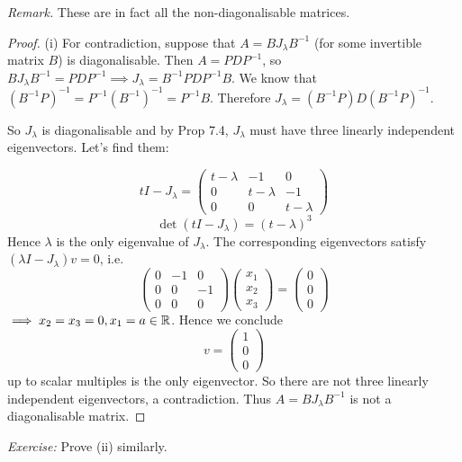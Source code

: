 \documentclass[10pt]{scrartcl}
\begin{document}
\emph{Remark.} These are in fact all the non-diagonalisable matrices.

\begin{proof}(i) For contradiction, suppose that $A = BJ_\lambda B^{-1}$ (for some invertible matrix $B$) is diagonalisable. Then $A = PDP^{-1}$, so $BJ_\lambda B^{-1} = PDP^{-1} \implies J_{\lambda} = B^{-1}PDP^{-1}B$. We know that $(B^{-1}P)^{-1} = P^{-1}(B^{-1})^{-1} = P^{-1}B$. Therefore $J_{\lambda} = (B^{-1}P)D(B^{-1}P)^{-1}$. 

So $J_\lambda$ is diagonalisable and by Prop 7.4, $J_\lambda$ must have three linearly independent eigenvectors. Let's find them:

\[
  tI - J_\lambda = \begin{pmatrix}
 t - \lambda & -1 & 0 \\ 0 & t-\lambda & -1 \\ 0 & 0& t-\lambda 	
 \end{pmatrix}
\]
\[
  \det(tI-J_\lambda) = (t-\lambda)^3
\]
Hence $\lambda$ is the only eigenvalue of $J_\lambda$. The corresponding eigenvectors satisfy $(\lambda I - J_\lambda)v = 0$, i.e. 
\[
  \begin{pmatrix}
  0 & -1 & 0\\ 0 & 0 & -1 \\ 0 & 0 & 0	
  \end{pmatrix}\begin{pmatrix}
x_1 \\ x_2 \\ x_3	
\end{pmatrix} = \begin{pmatrix}
 0 \\ 0\\ 0	
 \end{pmatrix}
\]
$\implies x_2 = x_3 = 0, x_1 = a \in\mathbb{R}$. Hence we conclude \[v = \begin{pmatrix}
 1 \\ 0 \\ 0	
 \end{pmatrix}\] up to scalar multiples is the only eigenvector. So there are not three linearly independent eigenvectors, a contradiction. Thus $A = BJ_\lambda B^{-1}$ is not a diagonalisable matrix.
\end{proof}

\emph{Exercise:} Prove (ii) similarly.\\
\end{document}
